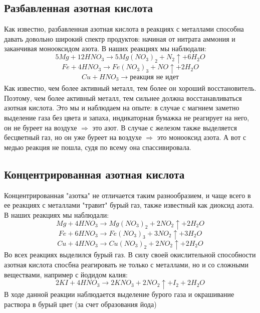\documentclass[a4paper, 12pt]{article}
\begin{document}
\subsection{Разбавленная азотная кислота}
Как известно, разбавленная азотная кислота в реакциях с металлами способна давать довольно широкий спектр продуктов: начиная от нитрата аммония и заканчивая монооксидом азота. В наших реакциях мы наблюдали:
\begin{equation}
    5Mg + 12HNO_3 \xrightarrow[]{} 5Mg(NO_3)_2 + N_2\uparrow + 6H_2O
\end{equation}
\begin{equation}
    Fe + 4HNO_3 \xrightarrow[]{} Fe(NO_3)_3 + NO\uparrow + 2H_2O
\end{equation}
\begin{equation}
    Cu + HNO_3 \xrightarrow[]{} \text{реакция не идет}
\end{equation}
Как известно, чем более активный металл, тем более он хороший восстановитель. Поэтому, чем более активный металл, тем сильнее должна восстанавливаться азотная кислота. Это мы и наблюдаем на опыте: в случае с магнием заметно выделение газа без цвета и запаха, индикаторная бумажка не реагирует на него, он не буреет на воздухе $\Rightarrow$ это азот. В случае с железом также выделяется бесцветный газ, но он уже буреет на воздухе $\Rightarrow$ это монооксид азота. А вот с медью реакция не пошла, судя по всему она спассивировала.
\subsection{Концентрированная азотная кислота}
Концентрированная "азотка" не отличается таким разнообразием, и чаще всего в ее реакциях с металлами "травит" бурый газ, также известный как диоксид азота. В наших реакциях мы наблюдали:
\begin{equation}
    Mg + 4HNO_3 \xrightarrow[]{} Mg(NO_3)_2 + 2NO_2 \uparrow + 2H_2O
\end{equation}
\begin{equation}
    Fe + 6HNO_3 \xrightarrow[]{} Fe(NO_3)_3 + 3NO_2\uparrow  + 3H_2O
\end{equation}
\begin{equation}
    Cu + 4HNO_3 \xrightarrow[]{} Cu(NO_3)_2 + 2NO_2 \uparrow + 2H_2 O
\end{equation}
Во всех реакциях выделился бурый газ. \newline
В силу своей окислительной способности азотная кислота спосбна реагировать не только с металлами, но и со сложными веществами, например с йодидом калия:
\begin{equation}
    2KI + 4HNO_3 \xrightarrow[]{} 2KNO_3 + 2NO_2\uparrow + I_2 + 2H_2O 
\end{equation}
В ходе данной реакции наблюдается выделение бурого газа и окрашивание раствора в бурый цвет (за счет образования йода)
\end{document}
